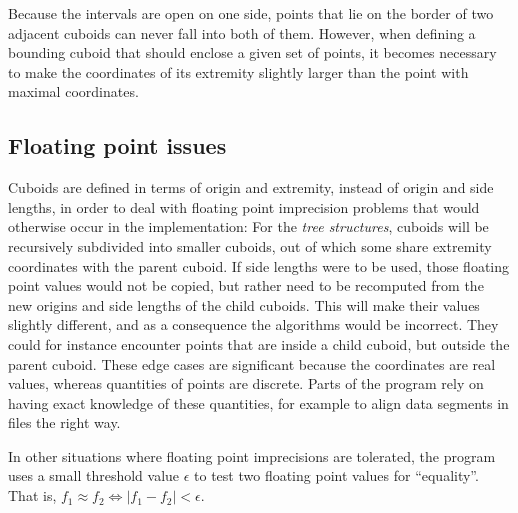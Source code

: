 \documentclass[a4paper,10pt,abstracton,notitlepage]{scrreprt}
\begin{document}
Because the intervals are open on one side, points that lie on the border of two adjacent cuboids can never fall into both of them. However, when defining a bounding cuboid that should enclose a given set of points, it becomes necessary to make the coordinates of its extremity slightly larger than the point with maximal coordinates.

\subsection{Floating point issues}
Cuboids are defined in terms of origin and extremity, instead of origin and side lengths, in order to deal with floating point imprecision problems that would otherwise occur in the implementation: For the \emph{tree structures}, cuboids will be recursively subdivided into smaller cuboids, out of which some share extremity coordinates with the parent cuboid. If side lengths were to be used, those floating point values would not be copied, but rather need to be recomputed from the new origins and side lengths of the child cuboids. This will make their values slightly different, and as a consequence the algorithms would be incorrect. They could for instance encounter points that are inside a child cuboid, but outside the parent cuboid.
These edge cases are significant because the coordinates are real values, whereas quantities of points are discrete. Parts of the program rely on having exact knowledge of these quantities, for example to align data segments in files the right way.

In other situations where floating point imprecisions are tolerated, the program uses a small threshold value $\epsilon$ to test two floating point values for ``equality''. That is, $f_{1} \approx f_{2} \Longleftrightarrow |f_{1} - f_{2}| < \epsilon$.
\end{document}
